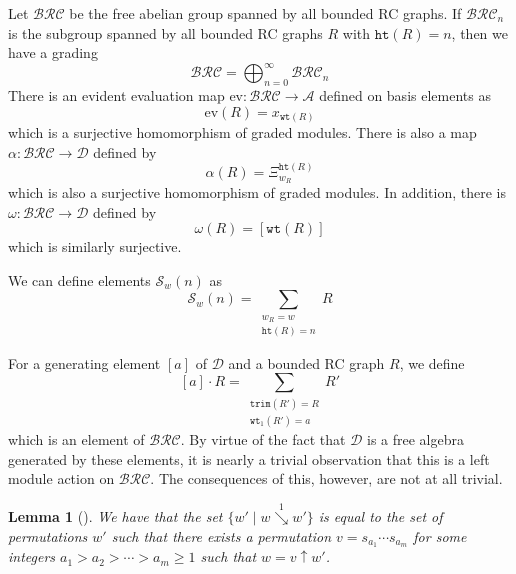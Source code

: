 \documentclass{amsart}
\newtheorem{lemma}{Lemma}[subsection]
\theoremstyle{definition}
\theoremstyle{remark}
\numberwithin{equation}{subsection}
\newcommand{\shup}{{\uparrow}}
\newcommand{\downvar}[1]{\stackrel{#1}{\searrow}}
\newcommand{\wof}[1]{w_{#1}}
\newcommand{\wtt}{\mathtt{wt}}
\newcommand{\trm}{\mathtt{trim}}
\newcommand{\hr}{\mathtt{ht}}
\newcommand{\BRC}{\mathcal{BRC}}
\newcommand{\dsch}{\ensuremath{\Xi}}
\newcommand{\coma}{\mathcal{A}}
\newcommand{\dcoma}{\mathcal{D}}
\begin{document}
Let $\BRC$ be the free abelian group spanned by all bounded RC graphs. If $\BRC_n$ is the subgroup spanned by all bounded RC graphs $R$ with $\hr(R)=n$, then we have a grading
$$\BRC = \bigoplus_{n=0}^\infty \BRC_n$$
There is an evident evaluation map $\mathrm{ev}: \BRC\to \coma$ defined on basis elements as
$$\mathrm{ev}(R) = x_{\wtt(R)}$$
which is a surjective homomorphism of graded modules. There is also a map $\alpha:\BRC\to\dcoma$ defined by
$$\alpha(R) = \dsch_{\wof{R}}^{\hr(R)}$$
which is also a surjective homomorphism of graded modules. In addition, there is $\omega:\BRC\to \dcoma$ defined by
$$\omega(R) = [\wtt(R)]$$
which is similarly surjective.

We can define elements $\mathcal{S}_w(n)$ as
$$\mathcal{S}_w(n) = \sum_{\substack{\wof{R}=w\\\hr(R)=n}}R$$

For a generating element $[a]$ of $\dcoma$ and a bounded RC graph $R$, we define 
$$[a]\cdot R=\sum_{\substack{\trm(R') = R\\\wtt_1(R') = a}}R'$$
which is an element of $\BRC$. By virtue of the fact that $\dcoma$ is a free algebra generated by these elements, it is nearly a trivial observation that this is a left module action on $\BRC$. The consequences of this, however, are not at all trivial.

\begin{lemma}[{\cite[Corollary~3.11]{bbrc}}] \label{lemma:d1desc}
We have that the set $\{w'\mid w\downvar{1} w'\}$ is equal to the set of permutations $w'$ such that there exists a permutation $v=s_{a_1}\cdots s_{a_m}$ for some integers $a_1>a_2>\cdots>a_m\geq 1$ such that $w =v\shup{w'}$.
\end{lemma}
\end{document}
